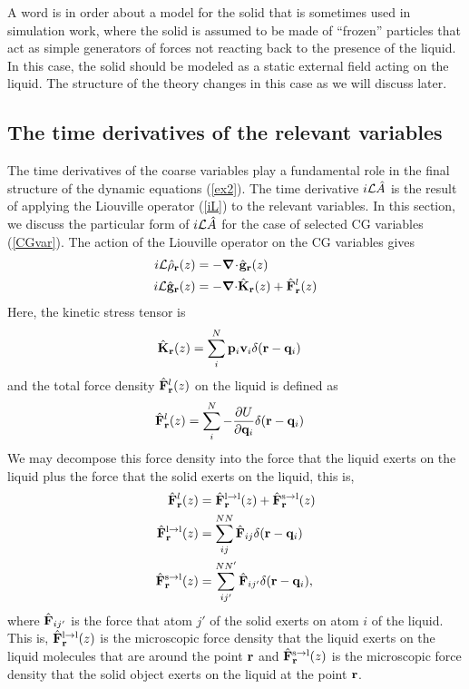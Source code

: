\documentclass[b5paper,openright,10pt]{book}
\newcommand{\esc}{\!\cdot\!}
\begin{document}
A word is in order about a  model for the solid that is sometimes used
in  simulation work,  where the  solid  is  assumed to  be made  of
``frozen''  particles that  act  as simple  generators  of forces  not
reacting back  to the presence of  the liquid. In this  case, the solid
should be modeled as a static external field acting on the liquid. The
structure of the theory changes in this case as we will discuss later. 

\subsection{The time derivatives of the relevant variables}
The time derivatives  of the coarse variables play  a fundamental role
in the final structure of  the dynamic equations (\ref{ex2}). The time
derivative $  i{\cal L}\hat{A}$ is  the result of  applying the  Liouville operator
(\ref{iL}) to the relevant variables.  In this section, we discuss the
particular  form of  $  i{\cal L}\hat{A}$ for  the case  of  selected CG  variables
(\ref{CGvar}). The action of the Liouville operator on the CG variables gives \cite{Espanol2015a}
\begin{align}
  i{\cal L} \hat{\rho}_{\bf r}(z) &= -\boldsymbol{\nabla}\esc\hat{\bf g}_{\bf r}(z)
\nonumber\\
i{\cal L}  \hat{\bf g}_{\bf r}(z) &= -\boldsymbol{\nabla}{\cdot} \hat{{\bf K}}_{\bf r}(z)+
\hat{\bf F}^l_{\bf r}(z)
\label{ildens}
\end{align}
Here, the kinetic stress tensor is 
\begin{align}
  \hat{{\bf K}}_{\bf r}(z) &=\sum^{N}_i{\bf p}_i{\bf v}_i
\delta({\bf r}-{\bf q}_i)
\end{align}
and the total  force density $\hat{\bf F}^l_{\bf r}(z)$  on the liquid
is defined as
\begin{align}
  \hat{\bf F}^l_{\bf r}(z) &
=\sum_i^N-\frac{\partial U}{\partial {\bf q}_i}\delta({\bf r}-{\bf q}_i)
\label{Frtot}
\end{align}
We may decompose  this force density into the
force that  the liquid exerts on  the liquid plus the  force that the
solid   exerts  on  the   liquid,  this   is,  
\begin{align}
   \hat{\bf  F}^l_{\bf
  r}(z)&=\hat{\bf  F}^{\rm l\to  l}_{\bf r}(z)  +\hat{\bf  F}^{\rm s\to
  l}_{\bf r}(z) 
\nonumber\\
\hat{\bf F}^{\rm l\to l}_{\bf r}(z) &= \sum^{NN}_{ij}\hat{\bf F}_{ij}\delta({\bf r}-{\bf q}_i)
\nonumber\\
\hat{\bf F}^{\rm s\to l}_{\bf r}(z) &= \sum^{NN'}_{ij'}\hat{\bf F}_{ij'}\delta({\bf r}-{\bf q}_i),
\label{Fr}
\end{align}
where $\hat{\bf F}_{ij'}$ is the force  that atom $j'$ of the solid
exerts on  atom $i$ of  the liquid.   This is, $\hat{\bf  F}^{\rm l\to
  l}_{\bf r}(z)  $ is  the microscopic force  density that  the liquid
exerts on the liquid molecules that are around the point ${\bf r}$ and
$\hat{\bf F}^{\rm s\to l}_{\bf r}(z)$ is the microscopic force density
that the solid object exerts on the liquid at the point ${\bf r}$.
\end{document}
